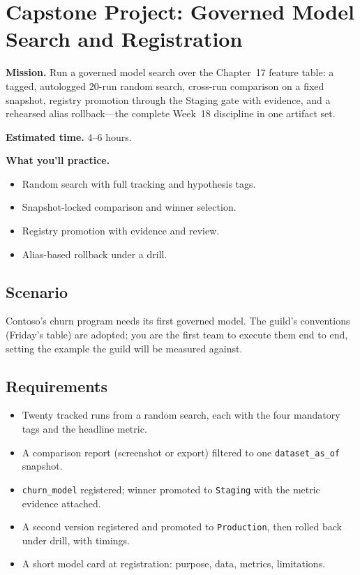\section{Capstone Project: Governed Model Search and Registration}\label{sec:ch18-capstone}

\begin{capstonebox}
\textbf{Mission.} Run a governed model search over the Chapter~17 feature table: a tagged, autologged 20-run random search, cross-run comparison on a fixed snapshot, registry promotion through the Staging gate with evidence, and a rehearsed alias rollback---the complete Week~18 discipline in one artifact set.

\textbf{Estimated time.} 4--6 hours.

\textbf{What you'll practice.}
\begin{itemize}
    \item Random search with full tracking and hypothesis tags.
    \item Snapshot-locked comparison and winner selection.
    \item Registry promotion with evidence and review.
    \item Alias-based rollback under a drill.
\end{itemize}
\end{capstonebox}

\subsection*{Scenario}
Contoso's churn program needs its first governed model. The guild's conventions (Friday's table) are adopted; you are the first team to execute them end to end, setting the example the guild will be measured against.

\subsection*{Requirements}
\begin{itemize}
    \item Twenty tracked runs from a random search, each with the four mandatory tags and the headline metric.
    \item A comparison report (screenshot or export) filtered to one \texttt{dataset\_as\_of} snapshot.
    \item \texttt{churn\_model} registered; winner promoted to \texttt{Staging} with the metric evidence attached.
    \item A second version registered and promoted to \texttt{Production}, then rolled back under drill, with timings.
    \item A short model card at registration: purpose, data, metrics, limitations.
\end{itemize}


